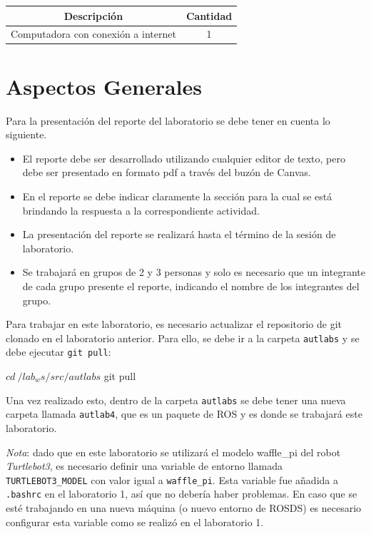 \documentclass[a4paper,11pt]{robotlabs}
\begin{document}
\begin{table}[h]
  \centering
  \begin{tabular}{cc}
    \toprule
    \textbf{Descripción} & \textbf{Cantidad} \\
    \midrule
    Computadora con conexi\'on a internet & 1 \\
    \bottomrule
    \end{tabular}
  \end{table}

\section{Aspectos Generales}

Para la presentación del reporte  del laboratorio se debe tener en cuenta lo
siguiente.
\begin{itemize}
\item El reporte debe ser desarrollado utilizando cualquier editor de texto,
  pero debe ser presentado en formato pdf a través del buzón de
  Canvas.
\item En el reporte se debe indicar claramente la sección para la cual se está
  brindando la respuesta a la correspondiente actividad.
\item La presentación del reporte se realizará hasta el término de la sesión de
  laboratorio.
\item Se trabajará en grupos de 2 y 3 personas y solo es necesario que un
  integrante de cada grupo presente el reporte, indicando el nombre de los
  integrantes del grupo.
\end{itemize}
Para trabajar en este laboratorio, es necesario actualizar el repositorio de
git clonado en el laboratorio anterior. Para ello, se debe ir a la carpeta
\texttt{autlabs} y se debe ejecutar \texttt{git pull}:
\begin{listingshell}
$ cd ~/lab_ws/src/autlabs
$ git pull
\end{listingshell}
\noindent Una vez realizado esto, dentro de la carpeta \texttt{autlabs} se debe
tener una nueva carpeta llamada \texttt{autlab4}, que es un paquete de ROS y es
donde se trabajará este laboratorio.

\noindent \textit{Nota}: dado que en este laboratorio se utilizará el modelo
waffle\_pi del robot \textit{Turtlebot3}, es necesario definir una variable de
entorno llamada \texttt{TURTLEBOT3\_MODEL} con valor igual a
\texttt{waffle\_pi}. Esta variable fue añadida a \texttt{.bashrc} en el
laboratorio 1, así que no debería haber problemas. En caso que se esté
trabajando en una nueva máquina (o nuevo entorno de ROSDS) es necesario
configurar esta variable como se realizó en el laboratorio 1.
\end{document}

